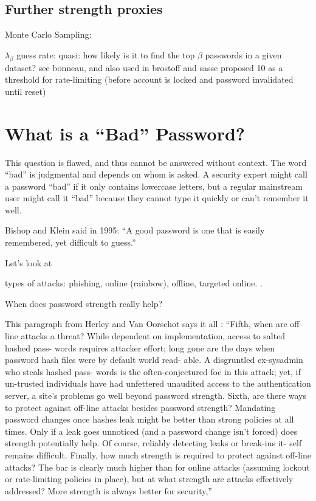 	\subsection{Further strength proxies}

	Monte Carlo Sampling: \cite{Dellamico2015MonteCarlo}

	
	$\lambda_{\beta}$ guess rate:
	quasi: how likely is it to find the top $\beta$ passwords in a given dataset?
	see bonneau, and also used in \cite{Yang2016MnemonicSentenceBased}
	brostoff and sasse  proposed 10 as a threshold for rate-limiting (before account is locked and password invalidated until reset) \cite{Brostoff2003TenStrikes}
	
	
	
	



\section{What is a ``Bad'' Password?}\label{sec:rw:whats_a_bad_pw}
This question is flawed, and thus cannot be answered without context. The word ``bad'' is judgmental and depends on whom is asked. A security expert might call a password ``bad'' if it only contains lowercase letters, but a regular mainstream user might call it ``bad'' because they cannot type it quickly or can't remember it well. 

Bishop and Klein said in 1995: ``A good password is one that is easily remembered, yet difficult to guess.'' \cite[p. 231]{Bishop1995ProactivePasswordChecking}

Let's look at 

types of attacks: phishing, online (rainbow), offline, targeted online. \cite{ZhangKennedy2016RevisitingPasswordRules}. 

When does password strength really help? 

This paragraph from Herley and Van Oorschot says it all \cite{Herley2012PersistenceOfPasswords}:
``Fifth, when are off-line attacks a threat? While dependent on implementation, access to salted hashed pass- words requires attacker effort; long gone are the days when password hash files were by default world read- able. A disgruntled ex-sysadmin who steals hashed pass- words is the often-conjectured foe in this attack; yet, if un-trusted individuals have had unfettered unaudited access to the authentication server, a site’s problems go well beyond password strength. Sixth, are there ways to protect against off-line attacks besides password strength? Mandating password changes once hashes leak might be better than strong policies at all times. Only if a leak goes unnoticed (and a password change isn’t forced) does strength potentially help. Of course, reliably detecting leaks or break-ins it- self remains difficult. Finally, how much strength is required to protect against off-line attacks? The bar is clearly much higher than for online attacks (assuming lockout or rate-limiting policies in place), but at what strength are attacks effectively addressed? More strength is always better for security,'' 

